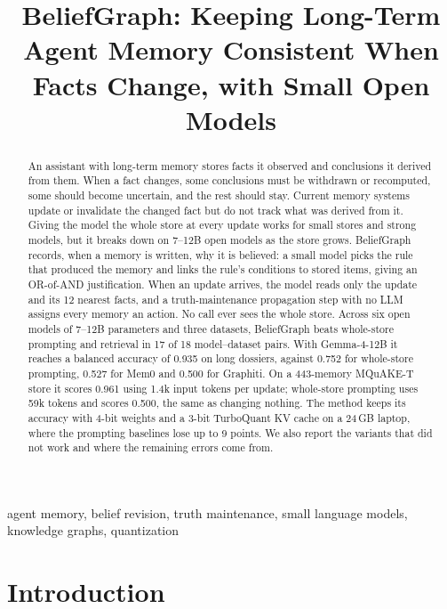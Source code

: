 \documentclass[conference]{IEEEtran}
\begin{document}
\title{BeliefGraph: Keeping Long-Term Agent Memory Consistent When Facts Change, with Small Open Models}

\author{
}

\maketitle

\begin{abstract}
An assistant with long-term memory stores facts it observed and conclusions it derived from them. When a fact changes, some conclusions must be withdrawn or recomputed, some should become uncertain, and the rest should stay. Current memory systems update or invalidate the changed fact but do not track what was derived from it. Giving the model the whole store at every update works for small stores and strong models, but it breaks down on 7--12B open models as the store grows. BeliefGraph records, when a memory is written, why it is believed: a small model picks the rule that produced the memory and links the rule's conditions to stored items, giving an OR-of-AND justification. When an update arrives, the model reads only the update and its 12 nearest facts, and a truth-maintenance propagation step with no LLM assigns every memory an action. No call ever sees the whole store. Across six open models of 7--12B parameters and three datasets, BeliefGraph beats whole-store prompting and retrieval in 17 of 18 model--dataset pairs. With Gemma-4-12B it reaches a balanced accuracy of 0.935 on long dossiers, against 0.752 for whole-store prompting, 0.527 for Mem0 and 0.500 for Graphiti. On a 443-memory MQuAKE-T store it scores 0.961 using 1.4k input tokens per update; whole-store prompting uses 59k tokens and scores 0.500, the same as changing nothing. The method keeps its accuracy with 4-bit weights and a 3-bit TurboQuant KV cache on a 24\,GB laptop, where the prompting baselines lose up to 9 points. We also report the variants that did not work and where the remaining errors come from.
\end{abstract}

\begin{IEEEkeywords}
agent memory, belief revision, truth maintenance, small language models, knowledge graphs, quantization
\end{IEEEkeywords}

\section{Introduction}
\end{document}
